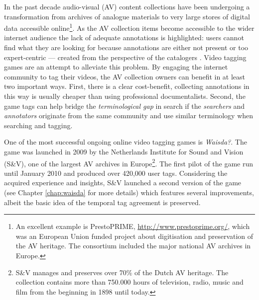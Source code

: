In the past decade audio-visual (AV) content collections have been undergoing a transformation from archives of analogue materials to very large stores of digital data accessible online\footnote{An excellent example is PrestoPRIME, \url{http://www.prestoprime.org/}, which was an European Union funded project about digitisation and preservation of the AV heritage. The consortium included the major national AV archives in Europe.}.  As the AV collection items become accessible to the wider internet audience the lack of adequate annotations is highlighted: users cannot find what they are looking for because annotations are either not present or too expert-centric --- created from the perspective of the catalogers \cite{johan-book-chap}. Video tagging games are an attempt to alleviate this problem. By engaging the internet community to tag their videos, the AV collection owners can benefit in at least two important ways. First, there is a clear cost-benefit, collecting annotations in this way is usually cheaper than using professional documentalists. Second, the game tags can help bridge the \textit{terminological gap} in search if the \textit{searchers} and \textit{annotators} originate from the same community and use similar terminology when searching and tagging. 

One of the most successful ongoing online video tagging games is \textit{Waisda?}.
The game was launched in 2009 by the Netherlands Institute for Sound and Vision (S\&V), one of the largest AV archives in Europe\footnote{S\&V manages and preserves over 70\% of the Dutch AV heritage. The collection contains more than 750.000 hours of television, radio, music and film from the beginning in 1898 until today.}.
The first pilot of the game run until January 2010 and produced over 420,000 user tags. Considering the acquired experience and insights, S\&V launched a second version of the game (see Chapter \ref{chap:waisda} for more details) which features several improvements, albeit the basic idea of the temporal tag agreement is preserved.

